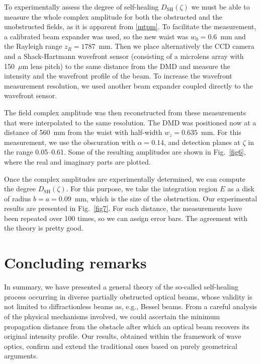 \documentclass[10pt]{article}
\newcommand{\sugg}[1]{{#1}}
\begin{document}
To experimentally assess the degree of self-healing
$D_{\mathrm{SH}} (\zeta)$ we must be able to measure the whole complex
amplitude for both the obstructed and the unobstructed fields, as it
is apparent from \eqref{mtpm}. To facilitate the measurement, a
calibrated beam expander was used, so the new waist was $w_{0} =
0.6$~mm and the Rayleigh range $z_{R} = 1787$~mm.  Then we place
alternatively the CCD camera and a Shack-Hartmann wavefront sensor
(consisting of a microlens array with 150~$\mu$m lens pitch) to
the same distance from the DMD and measure the intensity and the
wavefront profile of the beam.  To increase the wavefront measurement
resolution, we used another beam expander coupled directly to the
wavefront sensor.  

The field complex amplitude was then reconstructed from these
measurements that were interpolated to the same resolution.  The DMD
was positioned now at a distance of 560~mm from the waist with
half-width $w_{z} = 0.635$~mm. For this measurement, we use the
obscuration with $\alpha = 0.14$, and detection planes at $\zeta$ in
the range 0.05--0.61.  Some of the resulting amplitudes are shown in
Fig.~\ref{fig6}, where the real and imaginary parts are plotted.

Once the complex amplitudes are experimentally determined, we can
compute the degree $D_{\mathrm{SH}} ( \zeta)$. For this purpose, we take
the integration region $E$ as a disk of radius $b= a =0.09$~mm,
which is the size of the obstruction.  Our experimental results are
presented in Fig.~\ref{fig7}. For each distance, the measurements have
been repeated over 100 times, so we can assign error bars. The
agreement with the theory is pretty good.


\section{Concluding remarks}

\sugg{In summary, we have presented a general theory of the so-called
  self-healing process occurring in diverse partially obstructed
  optical beams, whose validity is not limited to diffractionless
  beams as, e.g., Bessel beams. From a careful analysis of the
  physical mechanisms involved, we could ascertain the minimum
  propagation distance from the obstacle after which an optical beam
  recovers its original intensity profile. Our results, obtained
  within the framework of wave optics, confirm and extend the
  traditional ones based on purely geometrical arguments.}
\end{document}
